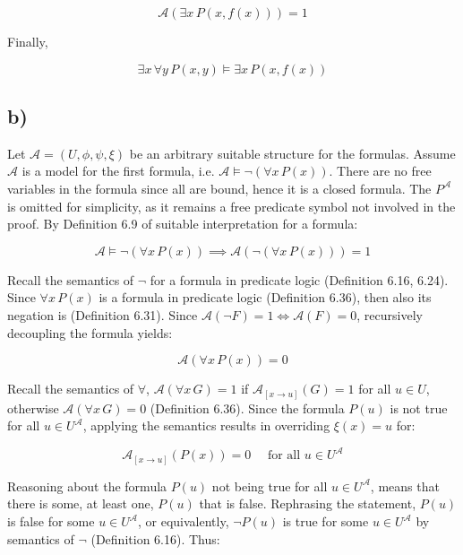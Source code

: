 \documentclass[unicode,11pt,a4paper,oneside,numbers=endperiod,openany]{scrartcl}
\def\struct{\mathcal{A}}
\begin{document}
\[
\struct (\exists x \, P(x, f(x))) = 1 
\]

\noindent Finally,

\[
\exists x \, \forall y \, P(x,y) \models \exists x \, P(x,f(x))
\]

\subsection*{b)}

Let \( \struct = (U, \phi, \psi, \xi) \) be an arbitrary suitable structure for the formulas.
Assume \( \struct \) is a model for the first formula, 
i.e. \( \struct \models \neg (\forall x \, P(x)) \).
There are no free variables in the formula since all are bound, hence it is a closed formula. 
The \( P^\struct \) is omitted for simplicity, as it remains a free predicate symbol 
not involved in the proof.
By Definition 6.9 of suitable interpretation for a formula:

\[
\struct \models \neg (\forall x \, P(x)) 
\implies 
\struct\left( 
     \neg (\forall x \, P(x))
\right) = 1
\]

\noindent Recall the semantics of \( \neg \) for a formula in predicate logic
(Definition 6.16, 6.24).
Since \( \forall x \, P(x) \) is a formula in predicate logic (Definition 6.36), 
then also its negation is (Definition 6.31). 
Since \( \struct(\neg F) = 1 \iff \struct(F) = 0 \), recursively decoupling the formula yields:

\[
\struct\left( 
    \forall x \, P(x)
\right) = 0
\]

\noindent Recall the semantics of \( \forall \),
\( \struct(\forall x \, G) = 1 \) if \( \struct_{[x \to u]}(G) = 1 \) for all \( u \in U \),
otherwise \( \struct(\forall x \, G) = 0 \) 
(Definition 6.36).
Since the formula \( P(u) \) is not true for all \( u \in U^\struct \),
applying the semantics results in overriding \( \xi(x) = u \) for:

\[
\struct_{[x \to u]}\left( 
    P(x)
\right) = 0
\quad
\text{ for all } u \in U^\struct
\]

\noindent Reasoning about the formula \( P(u) \) not being true for all \( u \in U^\struct \),
means that there is some, at least one, \( P(u) \) that is false.
Rephrasing the statement, \( P(u) \) is false for some \( u \in U^\struct \),
or equivalently, \( \neg P(u) \) is true for some \( u \in U^\struct \) 
by semantics of \( \neg \)
(Definition 6.16).
Thus:
\end{document}
